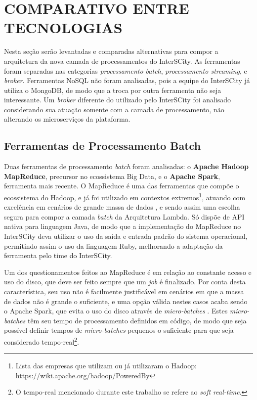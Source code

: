 \section{COMPARATIVO ENTRE TECNOLOGIAS}

Nesta seção serão levantadas e comparadas alternativas para compor a
arquitetura da nova camada de processamentos do InterSCity. As ferramentas
foram separadas nas categorias \textit{processamento batch},
\textit{processamento streaming}, e \textit{broker}. Ferramentas NoSQL não
foram analisadas, pois a equipe do InterSCity já utiliza o MongoDB, de modo
que a troca por outra ferramenta não seja interessante. Um \textit{broker}
diferente do utilizado pelo InterSCity foi analisado considerando sua atuação
somente com a camada de processamento, não alterando os microserviços
da plataforma.

\subsection{Ferramentas de Processamento Batch}

Duas ferramentas de processamento \textit{batch} foram analisadas: o
\textbf{Apache Hadoop MapReduce}, precursor no ecossistema Big Data, e o
\textbf{Apache Spark}, ferramenta mais recente. O MapReduce é uma das
ferramentas que compõe o ecossistema do Hadoop, e já foi utilizado em contextos
extremos\footnote{Lista das empresas que utilizam ou já
utilizaram o Hadoop: \url{https://wiki.apache.org/hadoop/PoweredBy}}, atuando
com excelência em cenários de grande massa de dados \cite{zaharia2008}, e sendo
assim uma escolha segura para compor a camada \textit{batch} da Arquitetura
Lambda. Só dispõe de API nativa para linguagem Java, de modo que a
implementação do MapReduce no InterSCity deva utilizar o uso da saída e entrada
padrão do sistema operacional, permitindo assim o uso da linguagem Ruby,
melhorando a adaptação da ferramenta pelo time do InterSCity.

Um dos questionamentos feitos ao MapReduce é em relação ao constante acesso e
uso do disco, que deve ser feito sempre que um \textit{job} é finalizado. Por
conta desta característica, seu uso não é facilmente justificável em cenários em
que a massa de dados não é grande o suficiente, e uma opção válida nestes casos
acaba sendo o Apache Spark, que evita o uso do disco através de
\textit{micro-batches} \cite{arsalan2014}. Estes \textit{micro-batches} têm seu
tempo de processamento definidos em código, de modo que seja possível definir
tempos de \textit{micro-batches} pequenos o suficiente para que seja considerado
tempo-real\footnote{O tempo-real mencionado durante este trabalho se refere ao
\textit{soft real-time}.}.

